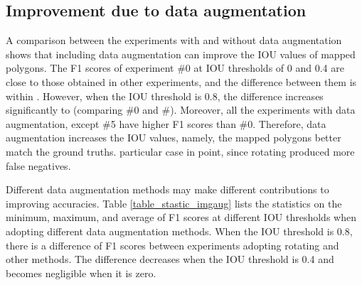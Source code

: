 \documentclass[authoryear,preprint,review,12pt]{elsarticle}
\begin{document}


\subsection{Improvement due to data augmentation}
\label{subsec_contrib_dataAug}

A comparison between the experiments with and without data augmentation shows that including data augmentation can improve the IOU values of mapped polygons.  The F1 scores of experiment \#0 at IOU thresholds of 0 and 0.4 are close to those obtained in other experiments, and the difference between them is within . 
However, when the IOU threshold is 0.8, the difference increases significantly to  (comparing \#0 and \#). Moreover, all the experiments with data augmentation, except \#5  have higher F1 scores than \#0.  Therefore, data augmentation increases the IOU values, namely, the mapped polygons better match the ground truths.  particular case in point, since rotating produced more false negatives. 


Different data augmentation methods may make different contributions to improving accuracies. Table \ref{table_stastic_imgaug} lists the statistics on the minimum, maximum, and average of F1 scores at different IOU thresholds when adopting different data augmentation methods. 
When the IOU threshold is 0.8, there is a difference of F1 scores between experiments adopting rotating and other methods. The difference decreases when the IOU threshold is 0.4 and becomes negligible when it is zero. 
\end{document}
